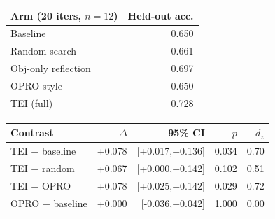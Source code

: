 \begin{tabular}{lr}
\toprule
Arm (20 iters, $n=12$) & Held-out acc. \\
\midrule
Baseline & 0.650 \\
Random search & 0.661 \\
Obj-only reflection & 0.697 \\
OPRO-style & 0.650 \\
TEI (full) & 0.728 \\
\bottomrule
\end{tabular}

\vspace{4pt}

\begin{tabular}{lrrrr}
\toprule
Contrast & $\Delta$ & 95\% CI & $p$ & $d_z$ \\
\midrule
TEI $-$ baseline & +0.078 & [+0.017,+0.136] & 0.034 & 0.70 \\
TEI $-$ random & +0.067 & [+0.000,+0.142] & 0.102 & 0.51 \\
TEI $-$ OPRO & +0.078 & [+0.025,+0.142] & 0.029 & 0.72 \\
OPRO $-$ baseline & +0.000 & [-0.036,+0.042] & 1.000 & 0.00 \\
\bottomrule
\end{tabular}